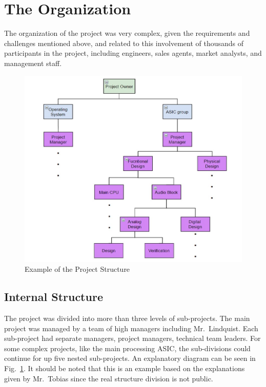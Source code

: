 \documentclass[journal]{IEEEtran}
\begin{document}
\section{The Organization}
The organization of the project was very complex, given the requirements and challenges mentioned above, and related to this involvement of thousands of participants in the project, including engineers, sales agents, market analysts, and management staff. 

\begin{figure}[h]
    \centering
    \includegraphics[width=\linewidth]{project_structure.jpg}
    \caption{Example of the Project Structure}
    \label{fig:project_structure}
\end{figure}

\subsection{Internal Structure}
The project was divided into more than three levels of sub-projects. The main project was managed by a team of high managers including Mr.~Lindquist. Each sub-project had separate managers, project managers, technical team leaders. For some complex projects, like the main processing ASIC, the sub-divisions could continue for up five nested sub-projects. An explanatory diagram can be seen in Fig.~\ref{fig:project_structure}. It should be noted that this is an example based on the explanations given by Mr.~Tobias since the real structure division is not public.
\end{document}
